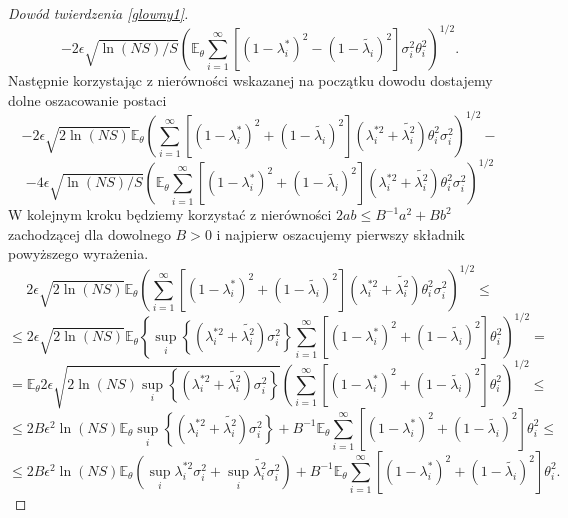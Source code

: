 \documentclass{article}
\begin{document}
\begin{proof}[Dowód twierdzenia \ref{glowny1}]
\begin{displaymath}
\end{displaymath}
\begin{displaymath}
-2\epsilon\sqrt{\ln (NS)/S}\left(\mathbb{E}_{\theta}\sum_{i=1}^{\infty}[(1-\lambda_i^*)^2-(1-\tilde{\lambda_i})^2]\sigma_i^2\theta_i^2\right)^{1/2}.
\end{displaymath}
Następnie korzystając z nierówności wskazanej na początku dowodu dostajemy dolne oszacowanie postaci
\begin{displaymath}
-2\epsilon\sqrt{2\ln (NS)}\mathbb{E}_{\theta}\left(\sum_{i=1}^{\infty}[(1-\lambda_i^*)^2+(1-\tilde{\lambda_i})^2](\lambda_i^{*2}+\tilde{\lambda_i^2})\theta_i^2\sigma_i^2\right)^{1/2}-
\end{displaymath}
\begin{displaymath}
-4\epsilon\sqrt{\ln (NS)/S}\left(\mathbb{E}_{\theta}\sum_{i=1}^{\infty}[(1-\lambda_i^*)^2+(1-\tilde{\lambda_i})^2](\lambda_i^{*2}+\tilde{\lambda_i^2})\theta_i^2\sigma_i^2\right)^{1/2}
\end{displaymath}
W kolejnym kroku będziemy korzystać z nierówności $2ab\leq B^{-1}a^2+Bb^2$ zachodzącej dla dowolnego $B>0$ i najpierw oszacujemy pierwszy składnik powyższego wyrażenia.
\begin{displaymath}
2\epsilon\sqrt{2\ln (NS)}\mathbb{E}_{\theta}\left(\sum_{i=1}^{\infty}[(1-\lambda_i^*)^2+(1-\tilde{\lambda_i})^2](\lambda_i^{*2}+\tilde{\lambda_i^2})\theta_i^2\sigma_i^2\right)^{1/2}\leq
\end{displaymath}
\begin{displaymath}
\leq 2\epsilon\sqrt{2\ln (NS)}\mathbb{E}_{\theta}\left\{\sup_i\left\{(\lambda_i^{*2}+\tilde{\lambda_i^2})\sigma_i^2\right\} \sum_{i=1}^{\infty}[(1-\lambda_i^*)^2+(1-\tilde{\lambda_i})^2]\theta_i^2\right)^{1/2}=
\end{displaymath}
\begin{displaymath}
=\mathbb{E}_{\theta}2\epsilon\sqrt{2\ln (NS)\sup_i\left\{(\lambda_i^{*2}+\tilde{\lambda_i^2})\sigma_i^2\right\}}\left(\sum_{i=1}^{\infty}[(1-\lambda_i^*)^2+(1-\tilde{\lambda_i})^2]\theta_i^2\right)^{1/2}\leq
\end{displaymath}
\begin{displaymath}
\leq 2B\epsilon^2 \ln (NS)\mathbb{E}_{\theta}\sup_i\left\{(\lambda_i^{*2}+\tilde{\lambda_i^2})\sigma_i^2\right\}+B^{-1}\mathbb{E}_{\theta}\sum_{i=1}^{\infty}[(1-\lambda_i^*)^2+(1-\tilde{\lambda_i})^2]\theta_i^2\leq
\end{displaymath}
\begin{displaymath}
\leq 2B\epsilon^2 \ln (NS)\mathbb{E}_{\theta}\left(\sup_i\lambda_i^{*2}\sigma_i^2+\sup_i\tilde{\lambda_i^2}\sigma_i^2\right)+B^{-1}\mathbb{E}_{\theta}\sum_{i=1}^{\infty}[(1-\lambda_i^*)^2+(1-\tilde{\lambda_i})^2]\theta_i^2.

\end{displaymath}
\end{proof}
\end{document}
